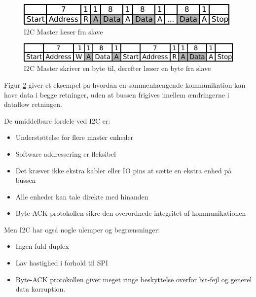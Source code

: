 \begin{figure}[H] \centering
    \includegraphics{0_Filer/Figuer/5_HW_Design/I2C_Read.png}
    \caption{I2C Master læser fra slave}
    \label{fig:HWD_I2C_read}
\end{figure}

\begin{figure}[H] \centering
    \includegraphics{0_Filer/Figuer/5_HW_Design/I2C_Mixed.png}
    \caption{I2C Master skriver en byte til, derefter læser en byte fra slave}
    \label{fig:HWD_I2C_blandet}
\end{figure}

Figur \ref{fig:HWD_I2C_blandet} giver et eksempel på hvordan en sammenhængende kommunikation kan have data i begge retninger, uden at bussen frigives imellem ændringerne i dataflow retningen.

De umiddelbare fordele ved I2C er:

\begin{itemize}
    \item Understøttelse for flere master enheder
    \item Software addressering er fleksibel
    \item Det kræver ikke ekstra kabler eller IO pins at sætte en ekstra enhed på bussen
    \item Alle enheder kan tale direkte med hinanden
    \item Byte-ACK protokollen sikre den overordnede integritet af kommunikationen
\end{itemize}

Men I2C har også nogle ulemper og begrænsninger:

\begin{itemize}
    \item Ingen fuld duplex
    \item Lav hastighed i forhold til SPI
    \item Byte-ACK protokollen giver meget ringe beskyttelse overfor bit-fejl og generel data korruption.
\end{itemize}
